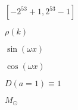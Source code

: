 \documentclass{article}
\begin{document}
$[-2^{53}+1, 2^{53}-1]$
\pagebreak

$\rho(k)$
\pagebreak

$\sin(\omega x)$
\pagebreak

$\cos(\omega x)$
\pagebreak

$D(a=1)\equiv1$
\pagebreak

$M_\odot$
\pagebreak
\end{document}
